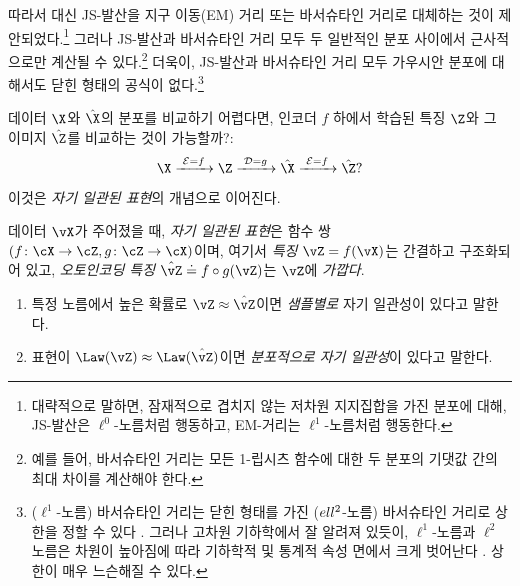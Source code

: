 \documentclass[../../book-main_ko.tex]{subfiles}
\begin{document}
따라서 대신 JS-발산을 지구 이동(EM) 거리 또는 바서슈타인 거리로 대체하는 것이 제안되었다.\footnote{대략적으로 말하면, 잠재적으로 겹치지 않는 저차원 지지집합을 가진 분포에 대해, JS-발산은 $\ell^0$-노름처럼 행동하고, EM-거리는 $\ell^1$-노름처럼 행동한다.} 그러나 JS-발산과 바서슈타인 거리 모두 두 일반적인 분포 사이에서 근사적으로만 계산될 수 있다.\footnote{예를 들어, 바서슈타인 거리는 모든 1-립시츠 함수에 대한 두 분포의 기댓값 간의 최대 차이를 계산해야 한다.} 더욱이, JS-발산과 바서슈타인 거리 모두 가우시안 분포에 대해서도 닫힌 형태의 공식이 없다.\footnote{($\ell^1$-노름) 바서슈타인 거리는 닫힌 형태를 가진 ($\\ell^2$-노름) 바서슈타인 거리로 상한을 정할 수 있다 \cite{salmona2021gromovwasserstein}. 그러나 고차원 기하학에서 잘 알려져 있듯이, $\ell^1$-노름과 $\ell^2$ 노름은 차원이 높아짐에 따라 기하학적 및 통계적 속성 면에서 크게 벗어난다 \cite{Wright-Ma-2021}. 상한이 매우 느슨해질 수 있다.} 

데이터 $\X$와 $\hat \X$의 분포를 비교하기 어렵다면, 인코더 $f$ 하에서 학습된 특징 $\Z$와 그 이미지 $\hat \Z$를 비교하는 것이 가능할까?:
\begin{equation}
 \X
\xrightarrow{\hspace{1mm} \mathcal{E} = f \hspace{1mm}} \Z  \xrightarrow{\hspace{1mm} \mathcal{D} = g \hspace{1mm}} \hat{\X} \xrightarrow{\hspace{1mm} \mathcal{E} = f \hspace{1mm}} \hat \Z?
\label{eqn:closed-autoencoding}
\end{equation}
이것은 {\em 자기 일관된 표현}의 개념으로 이어진다.

\begin{definition}[자기 일관된 표현]\label{def:closed_loop}
    데이터 $\vX$가 주어졌을 때, \textit{자기 일관된 표현}은 함수 쌍 $(f \colon \cX \to \cZ, g \colon \cZ \to \cX)$이며, 여기서 \textit{특징} $\vZ = f(\vX)$는 간결하고 구조화되어 있고, \textit{오토인코딩 특징} $\hat{\vZ} \doteq f \circ g(\vZ)$는 $\vZ$에 \textit{가깝다}.
    \begin{enumerate}
        \item 특정 노름에서 높은 확률로 $\vZ \approx \hat{\vZ}$이면 \textit{샘플별로} 자기 일관성이 있다고 말한다.
        	
\item 표현이 $\Law(\vZ) \approx \Law(\hat{\vZ})$이면 \textit{분포적으로 자기 일관성}이 있다고 말한다.
    \end{enumerate}
\end{definition}
\end{document}
